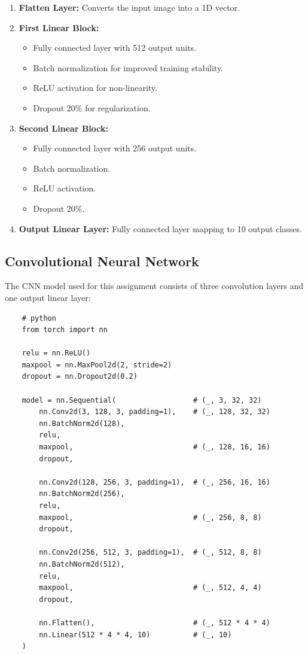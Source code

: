 \documentclass{report}
\begin{document}
\begin{enumerate}
    \item \textbf{Flatten Layer:} Converts the input image into a 1D vector.
    \item \textbf{First Linear Block:}
    \begin{itemize}
        \item Fully connected layer with 512 output units.
        \item Batch normalization for improved training stability.
        \item ReLU activation for non-linearity.
        \item Dropout 20\% for regularization.
    \end{itemize}
    \item \textbf{Second Linear Block:}
    \begin{itemize}
        \item Fully connected layer with 256 output units.
        \item Batch normalization.
        \item ReLU activation.
        \item Dropout 20\%.
    \end{itemize}
    \item \textbf{Output Linear Layer:} Fully connected layer mapping to 10 output classes.
\end{enumerate}

\subsection{Convolutional Neural Network}
The CNN model used for this assignment consists of three convolution layers and one output linear layer:

\begin{verbatim}
    # python
    from torch import nn

    relu = nn.ReLU()
    maxpool = nn.MaxPool2d(2, stride=2)
    dropout = nn.Dropout2d(0.2)

    model = nn.Sequential(                  # (_, 3, 32, 32)
        nn.Conv2d(3, 128, 3, padding=1),    # (_, 128, 32, 32)
        nn.BatchNorm2d(128),
        relu,
        maxpool,                            # (_, 128, 16, 16)
        dropout,

        nn.Conv2d(128, 256, 3, padding=1),  # (_, 256, 16, 16)
        nn.BatchNorm2d(256),
        relu,
        maxpool,                            # (_, 256, 8, 8)
        dropout,

        nn.Conv2d(256, 512, 3, padding=1),  # (_, 512, 8, 8)
        nn.BatchNorm2d(512),
        relu,
        maxpool,                            # (_, 512, 4, 4)
        dropout,

        nn.Flatten(),                       # (_, 512 * 4 * 4)
        nn.Linear(512 * 4 * 4, 10)          # (_, 10)
    )
\end{verbatim}
\end{document}
